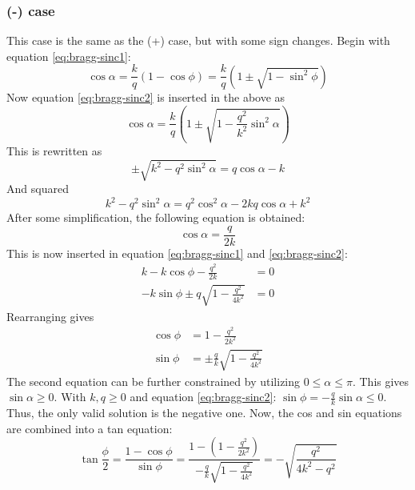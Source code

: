 \documentclass[10pt,a4paper,draft]{scrartcl}
\begin{document}
	\subsubsection{(-) case}
	This case is the same as the (+) case, but with some sign changes. Begin with equation \ref{eq:bragg-sinc1}:
	\begin{equation*}
	\cos{\alpha} = \frac{k}{q}\left( 1 - \cos{\phi} \right) = \frac{k}{q}\left( 1 \pm \sqrt{1-\sin^2{\phi}} \right)
	\end{equation*}
	Now equation \ref{eq:bragg-sinc2} is inserted in the above as
	\begin{equation*}
	\cos{\alpha} = \frac{k}{q}\left( 1 \pm \sqrt{1-\frac{q^2}{k^2}\sin^2{\alpha}} \right)
	\end{equation*}
	This is rewritten as
	\begin{equation*}
	\pm \sqrt{k^2-q^2\sin^2{\alpha}} = q\cos{\alpha} - k
	\end{equation*}
	And squared
	\begin{equation*}
	k^2 - q^2\sin^2{\alpha} = q^2\cos^2{\alpha} - 2kq\cos{\alpha} + k^2
	\end{equation*}
	After some simplification, the following equation is obtained:
	\begin{equation*}
	\cos{\alpha} = \frac{q}{2k}
	\end{equation*}
	This is now inserted in equation \ref{eq:bragg-sinc1} and \ref{eq:bragg-sinc2}:
	\begin{align*}
	k - k\cos{\phi} - \frac{q^2}{2k} &= 0 \\
	-k\sin{\phi} \pm q\sqrt{1-\frac{q^2}{4k^2}} &= 0
	\end{align*}
	Rearranging gives
	\begin{align*}
	\cos{\phi} &= 1 - \frac{q^2}{2k^2} \\
	\sin{\phi} &= \pm \frac{q}{k} \sqrt{1-\frac{q^2}{4k^2}}
	\end{align*}
	The second equation can be further constrained by utilizing $0 \leq \alpha \leq \pi$. This gives $\sin{\alpha} \geq 0$. With $k,q \geq 0$ and equation \ref{eq:bragg-sinc2}: $\sin{\phi} = -\frac{q}{k}\sin{\alpha} \leq 0$. Thus, the only valid solution is the negative one. Now, the cos and sin equations are combined into a tan equation:
	\begin{equation*}
	\tan{\frac{\phi}{2}} = \frac{1 - \cos{\phi}}{\sin{\phi}} = \frac{1 - \left( 1 - \frac{q^2}{2k^2} \right)}{-\frac{q}{k} \sqrt{1-\frac{q^2}{4k^2}}} = -\sqrt{\frac{q^2}{4k^2-q^2}}
	\end{equation*}
	
\end{document}
